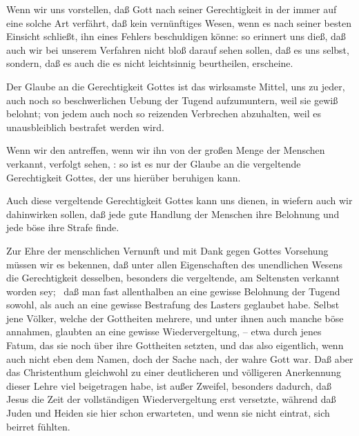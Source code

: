 \begin{aufza}
\item Wenn wir uns vorstellen, daß Gott nach seiner Gerechtigkeit in der  immer auf eine solche Art verfährt, daß kein vernünftiges Wesen, wenn es nach seiner besten Einsicht schließt, ihn eines Fehlers beschuldigen könne: so erinnert uns dieß, daß auch wir bei unserem Verfahren nicht bloß darauf sehen sollen, daß es uns selbst, sondern, daß es auch  die es nicht leichtsinnig beurtheilen,  erscheine.
\item Der Glaube an die  Gerechtigkeit Gottes ist das wirksamste Mittel, uns zu jeder, auch noch so beschwerlichen Uebung der Tugend aufzumuntern, weil sie gewiß belohnt; von jedem auch noch so reizenden Verbrechen abzuhalten, weil es unausbleiblich bestrafet werden wird.~
\item Wenn wir den  antreffen, wenn wir ihn von der großen Menge der Menschen verkannt, verfolgt sehen, \udgl : so ist es nur der Glaube an die vergeltende Gerechtigkeit Gottes, der uns hierüber beruhigen kann.
\item Auch diese vergeltende Gerechtigkeit Gottes kann uns  dienen, in wiefern auch wir dahinwirken sollen, daß jede gute Handlung der Menschen ihre Belohnung und jede böse ihre Strafe finde.
\end{aufza}

Zur Ehre der menschlichen Vernunft und mit Dank gegen Gottes Vorsehung müssen wir es bekennen, daß unter allen Eigenschaften des unendlichen Wesens die Gerechtigkeit desselben, besonders die vergeltende, am Seltensten verkannt worden sey; \dh\ daß man fast allenthalben an eine gewisse Belohnung der Tugend sowohl, als auch an eine gewisse Bestrafung des Lasters geglaubet habe. Selbst jene Völker, welche der Gottheiten mehrere, und unter ihnen auch manche böse annahmen, glaubten an eine gewisse Wiedervergeltung, -- etwa durch jenes Fatum, das sie noch über ihre Gottheiten setzten, und das also eigentlich, wenn auch nicht eben dem Namen, doch der Sache nach, der wahre Gott war. Daß aber das Christenthum gleichwohl zu einer deutlicheren und völligeren Anerkennung dieser Lehre viel beigetragen habe, ist außer Zweifel, besonders dadurch, daß Jesus die Zeit der vollständigen Wiedervergeltung erst  versetzte, während daß Juden und Heiden sie hier schon erwarteten, und wenn sie nicht eintrat, sich beirret fühlten.


